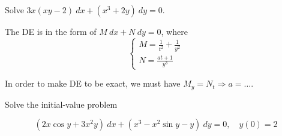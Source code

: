 \begin{example}
    Solve $3x(xy - 2)\> dx + (x^3 + 2y)\> dy = 0$.
\end{example}
\begin{solution}
    The DE is in the form of $M\> dx + N\> dy = 0$, where 
    \[
        \begin{cases}
            M = \displaystyle \frac{1}{t^2} + \frac{1}{y^2} \\[1em]
            N = \displaystyle \frac{at + 1}{y^3}
        \end{cases}
    \]

    In order to make DE to be exact, we must have $M_y = N_t \Rightarrow a = \ldots$.
\end{solution}

\begin{example}
    Solve the initial-value problem

    \[
        (2x\cos y + 3x^2 y)\> dx + (x^3 - x^2 \sin y - y)\> dy = 0, \quad y(0) = 2
    \]
\end{example}
